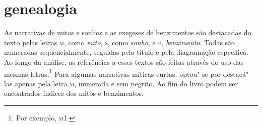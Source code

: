 \section{genealogia}

As narrativas de mitos e sonhos e as exegeses de benzimentos são
destacadas do texto pelas letras \textsc{m}, como \textit{mito}, \textsc{s}, como \textit{sonho}, e
\textsc{b}, \textit{benzimento}. Todas são numeradas sequencialmente, seguidas
pelo título e pela diagramação específica. Ao longo da análise, as
referências a esses textos são feitas através do uso das mesmas letras.\footnote{Por exemplo, \textsc{m1}.} Para algumas narrativas míticas curtas, optou"-se
por destacá"-las apenas pela letra \textsc{m}, numerada e sem negrito. Ao fim do
livro podem ser encontrados índices dos mitos e benzimentos.



